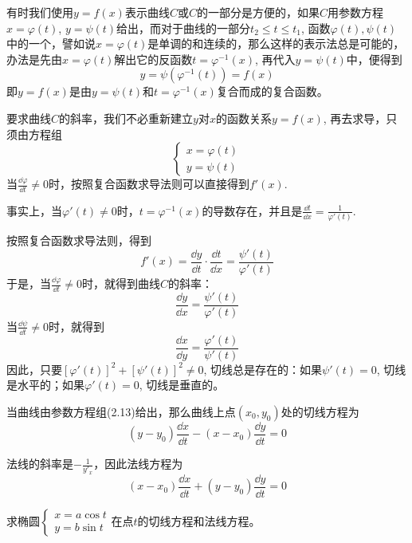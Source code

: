 有时我们使用$y=f(x)$表示曲线$C$或$C$的一部分是方便的，如果$C$用参数方程$x=\varphi(t)$, $y=\psi(t)$给出，而对于曲线的一部分$t_2\le t\le t_1$, 函数$\varphi(t),\psi(t)$中的一个，譬如说$x=\varphi(t)$是单调的和连续的，那么这样的表示法总是可能的，办法是先由$x=\varphi(t)$解出它的反函数$t=\varphi^{-1}(x)$, 再代入$y=\psi(t)$中，便得到
\[y=\psi\left(\varphi^{-1}(t)\right)=f(x)\]
即$y=f(x)$是由$y=\psi(t)$和$t=\varphi^{-1}(x)$复合而成的复合函数。

要求曲线$C$的斜率，我们不必重新建立$y$对$x$的函数关系$y=f(x)$, 再去求导，只须由方程组
\begin{equation}
    \begin{cases}
        x=\varphi(t)\\ y=\psi(t)
    \end{cases}
\end{equation}
当$\frac{\dd\varphi}{\dd t}\ne 0$时，按照复合函数求导法则可以直接得到$f'(x)$.

事实上，当$\varphi'(t)\ne 0$时，$t=\varphi^{-1}(x)$的导数存在，并且是$\frac{\dd t}{\dd 
x}=\frac{1}{\varphi'(t)}$.

按照复合函数求导法则，得到
\[f'(x)=\frac{\dd y}{\dd t}\cdot \frac{\dd t}{\dd x}=\frac{\psi'(t)}{\varphi'(t)}\]
于是，当$\frac{\dd\varphi}{\dd t}\ne 0$时，就得到曲线$C$的斜率：
\begin{equation}
    \frac{\dd y}{\dd x}=\frac{\psi'(t)}{\varphi'(t)}
\end{equation}
当$\frac{\dd\psi}{\dd t}\ne 0$时，就得到
\begin{equation}
    \frac{\dd x}{\dd y}=\frac{\varphi'(t)}{\psi'(t)}
\end{equation}
因此，只要$[\varphi'(t)]^2+[\psi'(t)]^2\ne 0$, 切线总是存在的：如果$\psi'(t)=0$, 切线是水平的；如果$\varphi'(t)=0$, 切线是垂直的。

当曲线由参数方程组(2.13)给出，那么曲线上点$(x_0,y_0)$处的切线方程为
\begin{equation}
    (y-y_0)\frac{\dd x}{\dd t}-(x-x_0)\frac{\dd y}{\dd t}=0
\end{equation}

法线的斜率是$-\frac{1}{y'_x}$，因此法线方程为
\begin{equation}
    (x-x_0)\frac{\dd x}{\dd t}+(y-y_0)\frac{\dd y}{\dd t}=0
\end{equation}

\begin{example}
求椭圆$\begin{cases}
    x=a\cos t\\ y=b\sin t
\end{cases}$在点$t$的切线方程和法线方程。
\end{example}


